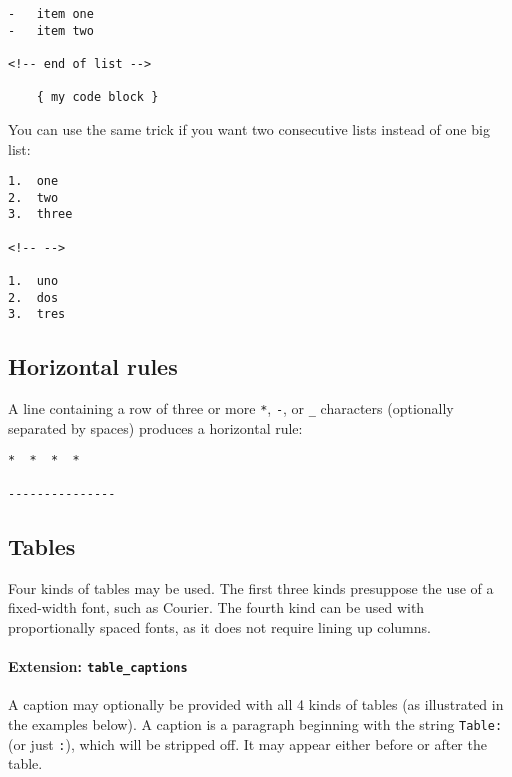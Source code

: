 \documentclass[]{article}
\begin{document}
\begin{verbatim}
-   item one
-   item two

<!-- end of list -->

    { my code block }
\end{verbatim}

You can use the same trick if you want two consecutive lists instead of
one big list:

\begin{verbatim}
1.  one
2.  two
3.  three

<!-- -->

1.  uno
2.  dos
3.  tres
\end{verbatim}

\hypertarget{horizontal-rules}{%
\subsection{Horizontal rules}\label{horizontal-rules}}

A line containing a row of three or more \texttt{*}, \texttt{-}, or
\texttt{\_} characters (optionally separated by spaces) produces a
horizontal rule:

\begin{verbatim}
*  *  *  *

---------------
\end{verbatim}

\hypertarget{tables}{%
\subsection{Tables}\label{tables}}

Four kinds of tables may be used. The first three kinds presuppose the
use of a fixed-width font, such as Courier. The fourth kind can be used
with proportionally spaced fonts, as it does not require lining up
columns.

\hypertarget{extension-table_captions}{%
\paragraph{\texorpdfstring{Extension:
\texttt{table\_captions}}{Extension: table\_captions}}\label{extension-table_captions}}

A caption may optionally be provided with all 4 kinds of tables (as
illustrated in the examples below). A caption is a paragraph beginning
with the string \texttt{Table:} (or just \texttt{:}), which will be
stripped off. It may appear either before or after the table.
\end{document}

